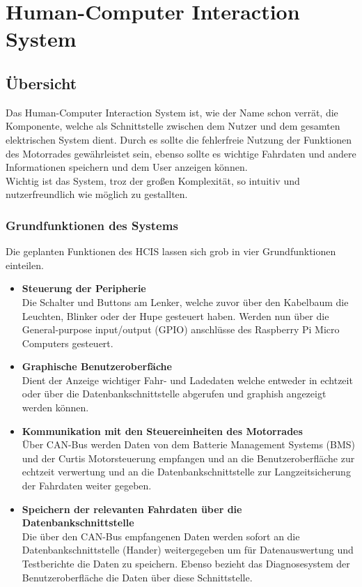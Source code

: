 

\chapter{Human-Computer Interaction System}

\section{Übersicht}
Das Human-Computer Interaction System ist, wie der Name schon verrät, die Komponente, welche als Schnittstelle zwischen dem Nutzer und dem gesamten elektrischen System dient. Durch es sollte die fehlerfreie Nutzung der Funktionen des Motorrades gewährleistet sein, ebenso sollte es wichtige Fahrdaten und andere Informationen speichern und dem User anzeigen können.\\
Wichtig ist das System, troz der großen Komplexität, so intuitiv und nutzerfreundlich wie möglich zu gestallten.

\subsection{Grundfunktionen des Systems}
Die geplanten Funktionen des HCIS lassen sich grob in vier Grundfunktionen einteilen.
\begin{itemize}
	\item \textbf{Steuerung der Peripherie} \medskip\\
	Die Schalter und Buttons am Lenker, welche zuvor über den Kabelbaum die Leuchten, Blinker oder der Hupe gesteuert haben. Werden nun über die General-purpose input/output (GPIO) anschlüsse des Raspberry Pi Micro Computers gesteuert.
	\item \textbf{Graphische Benutzeroberfäche}\medskip\\
Dient der Anzeige wichtiger Fahr- und Ladedaten welche entweder in echtzeit oder über die Datenbankschnittstelle abgerufen und graphish angezeigt werden können.
	\item \textbf{Kommunikation mit den Steuereinheiten des Motorrades} \medskip\\
	Über CAN-Bus werden Daten von dem Batterie Management Systems (BMS) und der Curtis Motorsteuerung empfangen und an die Benutzeroberfläche zur echtzeit verwertung und an die Datenbankschnittstelle zur Langzeitsicherung der Fahrdaten weiter gegeben.
	\item \textbf{Speichern der relevanten Fahrdaten über die Datenbankschnittstelle} \medskip\\
Die über den CAN-Bus empfangenen Daten werden sofort an die Datenbankschnittstelle (Hander) weitergegeben um für Datenauswertung und Testberichte die Daten zu speichern. Ebenso bezieht das Diagnosesystem der Benutzeroberfläche die Daten über diese Schnittstelle.
\end{itemize}
\newpage

